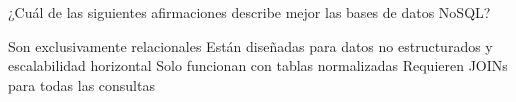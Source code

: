 \question[1] ¿Cuál de las siguientes afirmaciones describe mejor las bases de datos NoSQL?
\begin{choices}
\choice Son exclusivamente relacionales
\CorrectChoice Están diseñadas para datos no estructurados y escalabilidad horizontal
\choice Solo funcionan con tablas normalizadas
\choice Requieren JOINs para todas las consultas
\end{choices}
